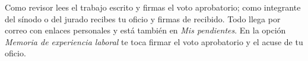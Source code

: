 \documentclass[11pt,a4paper]{article}
\begin{document}
{\small\tableofcontents}
\newpage
\begin{quevasahacer}
Como revisor lees el trabajo escrito y firmas el voto aprobatorio; como integrante del sínodo o del jurado recibes tu oficio y firmas de recibido. Todo llega por correo con enlaces personales y está también en \emph{Mis pendientes}. En la opción \emph{Memoria de experiencia laboral} te toca firmar el voto aprobatorio y el acuse de tu oficio.
\end{quevasahacer}



\end{document}
